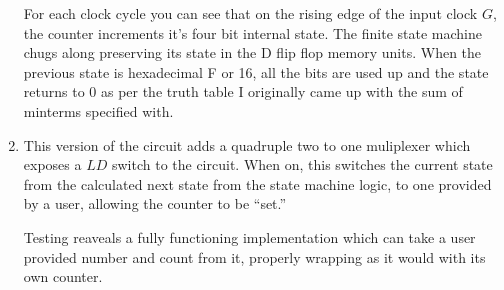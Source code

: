 \documentclass[11pt]{article}
\begin{document}
\begin{enumerate}
{	For each clock cycle you can see that on the rising edge of the input clock
	$G$, the counter increments it's four bit internal state. The finite state
	machine chugs along preserving its state in the D flip flop memory units. When
	the previous state is hexadecimal F or 16, all the bits are used up and the
	state returns to 0 as per the truth table I originally came up with the sum
	of minterms specified with.
}
\item{
	This version of the circuit adds a quadruple two to one muliplexer which
	exposes a $LD$ switch to the circuit. When on, this switches the current state
	from the calculated next state from the state machine logic, to one provided
	by a user, allowing the counter to be ``set.''

	Testing reaveals a fully
	functioning implementation which can take a user provided number and count
	from it, properly wrapping as it would with its own counter.
}

\end{enumerate}
\end{document}
